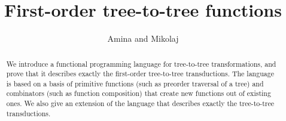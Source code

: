 \documentclass[sigplan,10pt,manonymous]{acmart}\settopmatter{printfolios=true,printccs=false,printacmref=false}
\begin{document}
 \title{First-order tree-to-tree functions}
 \author{Amina and Mikolaj}
 \begin{abstract}
    We introduce a functional programming language for tree-to-tree transformations, and prove  that it describes exactly the first-order tree-to-tree transductions. The language is based on a basis of  primitive functions (such as preorder traversal of a tree)  and 
    combinators (such as function composition) that create new functions out of existing ones. We also give an extension of the language that describes exactly the \mso tree-to-tree transductions.
\end{abstract}

 \maketitle






%


%

% 
%






\appendix






% 
\end{document}
